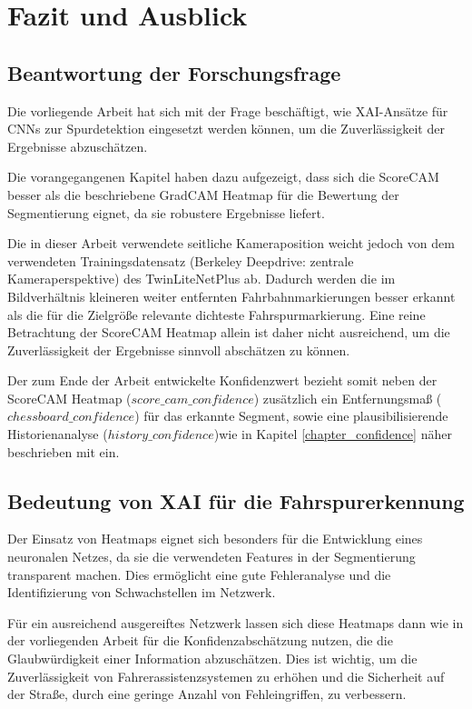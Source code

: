 \chapter{Fazit und Ausblick} 

\label{FazitUndAusblick}

\section{Beantwortung der Forschungsfrage}
Die vorliegende Arbeit hat sich mit der Frage beschäftigt, wie XAI-Ansätze für CNNs zur Spurdetektion eingesetzt werden können, um die Zuverlässigkeit der Ergebnisse abzuschätzen.

Die vorangegangenen Kapitel haben dazu aufgezeigt, dass sich die ScoreCAM besser als die beschriebene GradCAM Heatmap für die Bewertung der Segmentierung eignet, da sie robustere Ergebnisse liefert.

Die in dieser Arbeit verwendete seitliche Kameraposition weicht jedoch von dem verwendeten Trainingsdatensatz (Berkeley Deepdrive: zentrale Kameraperspektive) des TwinLiteNetPlus ab.
Dadurch werden die im Bildverhältnis kleineren weiter entfernten Fahrbahnmarkierungen besser erkannt als die für die Zielgrö{\ss}e relevante dichteste Fahrspurmarkierung.
Eine reine Betrachtung der ScoreCAM Heatmap allein ist daher nicht ausreichend, um die Zuverlässigkeit der Ergebnisse sinnvoll abschätzen zu können.

Der zum Ende der Arbeit entwickelte Konfidenzwert bezieht somit neben der ScoreCAM Heatmap ($score\_cam\_confidence$) zusätzlich ein Entfernungsma{\ss} ($chessboard\_confidence$) für das erkannte Segment, sowie eine plausibilisierende Historienanalyse ($history\_confidence$)wie in Kapitel \ref{chapter_confidence} näher beschrieben mit ein.

\section{Bedeutung von XAI für die Fahrspurerkennung}
    Der Einsatz von Heatmaps eignet sich besonders für die Entwicklung eines neuronalen Netzes, da sie die verwendeten Features in der Segmentierung transparent machen. Dies ermöglicht eine gute Fehleranalyse und die Identifizierung von Schwachstellen im Netzwerk.

    Für ein ausreichend ausgereiftes Netzwerk lassen sich diese Heatmaps dann wie in der vorliegenden Arbeit für die Konfidenzabschätzung nutzen, die die Glaubwürdigkeit einer Information abzuschätzen.
    Dies ist wichtig, um die Zuverlässigkeit von Fahrerassistenzsystemen zu erhöhen und die Sicherheit auf der Stra{\ss}e, durch eine geringe Anzahl von Fehleingriffen, zu verbessern.

